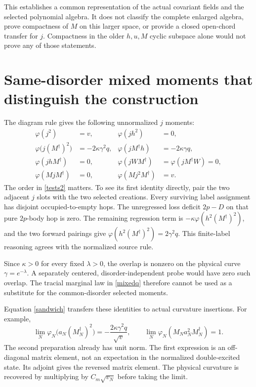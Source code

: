 \documentclass[11pt]{article}
\begin{document}
This establishes a common representation of the actual covariant
fields and the selected polynomial algebra. It does not classify
the complete enlarged algebra, prove compactness of $M$ on this
larger space, or provide a closed open-chord transfer for $j$.
Compactness in the older $h,u,M$ cyclic subspace alone would not
prove any of those statements.

\newpage
\section{Same-disorder mixed moments that distinguish the construction}
The diagram rule gives the following unnormalized $j$ moments:
\begin{align}
 \varphi(j^2)&=v,&\varphi(jh^2)&=0,\label{tests1}\\
 \varphi\bigl(j(M^\dagger)^2\bigr)&=-2\kappa\gamma^2q,&
 \varphi(jM^\dagger h)&=-2\kappa\gamma q,\label{tests2}\\
 \varphi(jhM^\dagger)&=0,&
 \varphi(jWM^\dagger)&=\varphi(jM^\dagger W)=0,\nonumber\\
 \varphi(MjM^\dagger)&=0,&
 \varphi(Mj^2M^\dagger)&=v.\label{tests3}
\end{align}
The order in \eqref{tests2} matters. To see its first identity directly,
pair the two adjacent $j$ slots with the two selected creations.
Every surviving label assignment has disjoint occupied-to-empty
hops. The unregressed loss deficit $2p-D$ on that pure $2p$-body
hop is zero. The remaining regression term is
$-\kappa\varphi(h^2(M^\dagger)^2)$, and the two forward pairings give
$\varphi(h^2(M^\dagger)^2)=2\gamma^2q$.
This finite-label reasoning agrees with the normalized source rule.

Since $\kappa>0$ for every fixed $\lambda>0$, the overlap is
nonzero on the physical curve $\gamma=e^{-\lambda}$. A separately
centered, disorder-independent probe would have zero such overlap.
The tracial marginal law in \eqref{mixedq} therefore cannot be used
as a substitute for the common-disorder selected moments.

Equation \eqref{sandwich} transfers these identities to actual
curvature insertions. For example,
\begin{equation}\label{actualtests}
 \lim_N\varphi_N\bigl(a_N(M_N^\dagger)^2\bigr)
   =-\frac{2\kappa\gamma^2q}{\sqrt v},\qquad
 \lim_N\varphi_N(M_Na_N^2M_N^\dagger)=1.
\end{equation}
The second preparation already has unit norm. The first expression
is an off-diagonal matrix element, not an expectation in the
normalized double-excited state. Its adjoint gives the reversed
matrix element. The physical curvature is recovered by multiplying
by $C_m\sqrt{v_N}$ before taking the limit.
\end{document}
